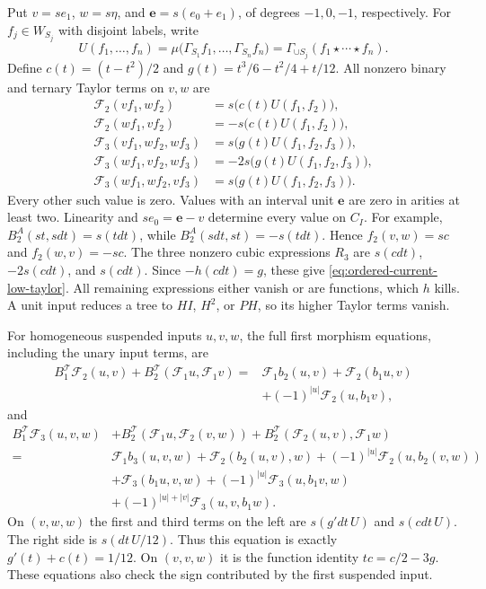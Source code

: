 Put $v=se_1$, $w=s\eta$, and $\mathbf e=s(e_0+e_1)$, of degrees
$-1,0,-1$, respectively.  For $f_j\in W_{S_j}$ with disjoint labels,
write
\[
 U(f_1,\ldots,f_n)=
 \mu\bigl(\Gamma_{S_1}f_1,\ldots,\Gamma_{S_n}f_n\bigr)
 =\Gamma_{\cup S_j}(f_1\star\cdots\star f_n).
\]
Define
$c(t)=(t-t^2)/2$ and $g(t)=t^3/6-t^2/4+t/12$.
All nonzero binary and ternary Taylor terms on $v,w$ are
\begin{equation}
\label{eq:ordered-current-low-taylor}
 \begin{aligned}
 \mathcal F_2(vf_1,wf_2)&=s\bigl(c(t)U(f_1,f_2)\bigr),\\
 \mathcal F_2(wf_1,vf_2)&=-s\bigl(c(t)U(f_1,f_2)\bigr),\\
 \mathcal F_3(vf_1,wf_2,wf_3)&=s\bigl(g(t)U(f_1,f_2,f_3)\bigr),\\
 \mathcal F_3(wf_1,vf_2,wf_3)&=-2s\bigl(g(t)U(f_1,f_2,f_3)\bigr),\\
 \mathcal F_3(wf_1,wf_2,vf_3)&=s\bigl(g(t)U(f_1,f_2,f_3)\bigr).
 \end{aligned}
\end{equation}
Every other such value is zero.  Values with an interval unit
$\mathbf e$ are zero in arities at least two.  Linearity and
$se_0=\mathbf e-v$ determine every value on $C_I$.
For example, $B^A_2(st,sdt)=s(tdt)$, while
$B^A_2(sdt,st)=-s(tdt)$.  Hence $f_2(v,w)=sc$ and $f_2(w,v)=-sc$.
The three nonzero cubic expressions $R_3$ are
$s(cdt)$, $-2s(cdt)$, and $s(cdt)$.
Since $-h(cdt)=g$, these give \eqref{eq:ordered-current-low-taylor}.
All remaining expressions either vanish or are functions, which
$h$ kills.  A unit input reduces a tree to $HI$, $H^2$, or $PH$,
so its higher Taylor terms vanish.

For homogeneous suspended inputs $u,v,w$, the full first morphism
equations, including the unary input terms, are
\begin{equation}
\label{eq:ordered-current-F2-equation}
 \begin{split}
 B_1^{\mathcal T}\mathcal F_2(u,v)
 +B_2^{\mathcal T}(\mathcal F_1u,\mathcal F_1v)
 ={}&\mathcal F_1b_2(u,v)+\mathcal F_2(b_1u,v)\\
 &+(-1)^{|u|}\mathcal F_2(u,b_1v),
 \end{split}
\end{equation}
and
\begin{equation}
\label{eq:ordered-current-F3-equation}
 \begin{split}
 B_1^{\mathcal T}\mathcal F_3(u,v,w)
 &+B_2^{\mathcal T}(\mathcal F_1u,\mathcal F_2(v,w))
  +B_2^{\mathcal T}(\mathcal F_2(u,v),\mathcal F_1w)\\
 ={}&\mathcal F_1b_3(u,v,w)+\mathcal F_2(b_2(u,v),w)
       +(-1)^{|u|}\mathcal F_2(u,b_2(v,w))\\
 &+\mathcal F_3(b_1u,v,w)+(-1)^{|u|}\mathcal F_3(u,b_1v,w)\\
 &+(-1)^{|u|+|v|}\mathcal F_3(u,v,b_1w).
 \end{split}
\end{equation}
On $(v,w,w)$ the first and third terms on the left are
$s(g' dt\,U)$ and $s(cdt\,U)$.
The right side is $s(dt\,U/12)$.
Thus this equation is exactly $g'(t)+c(t)=1/12$.
On $(v,v,w)$ it is the function identity
$tc=c/2-3g$.  These equations also check the sign contributed by
the first suspended input.

